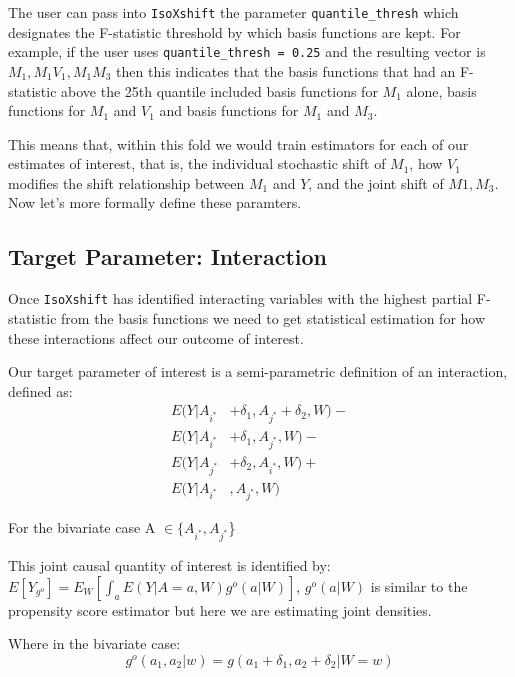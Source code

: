 \documentclass[
]{article}
\begin{document}
The user can pass into \texttt{IsoXshift} the parameter
\texttt{quantile\_thresh} which designates the F-statistic threshold by
which basis functions are kept. For example, if the user uses
\texttt{quantile\_thresh\ =\ 0.25} and the resulting vector is
\(M_1, M_1V_1, M_1M_3\) then this indicates that the basis functions
that had an F-statistic above the 25th quantile included basis functions
for \(M_1\) alone, basis functions for \(M_1\) and \(V_1\) and basis
functions for \(M_1\) and \(M_3\).

This means that, within this fold we would train estimators for each of
our estimates of interest, that is, the individual stochastic shift of
\(M_1\), how \(V_1\) modifies the shift relationship between \(M_1\) and
\(Y\), and the joint shift of \(M1,M_3\). Now let's more formally define
these paramters.

\hypertarget{target-parameter-interaction}{%
\subsection{Target Parameter:
Interaction}\label{target-parameter-interaction}}

Once \texttt{IsoXshift} has identified interacting variables with the
highest partial F-statistic from the basis functions we need to get
statistical estimation for how these interactions affect our outcome of
interest.

Our target parameter of interest is a semi-parametric definition of an
interaction, defined as: \begin{equation} \label{eq1}
\begin{split}
E(Y|A_{i^*} &+ \delta_1, A_{j^*} + \delta_2, W) - \\ 
E(Y|A_{i^*} &+ \delta_1, A_{j^*}, W) - \\ 
E(Y|A_{j^*} &+ \delta_2,  A_{i^*}, W) + \\
E(Y|A_{i^*}&, A_{j^*}, W) 
\end{split}
\end{equation}

For the bivariate case A \(\in \{A_{i^*}, A_{j^*}\)\}

This joint causal quantity of interest is identified by:
\(E[Y_{g^o}] = E_W [\int_a E(Y|A=a, W)g^o(a|W)]\), \(g^o(a|W)\) is
similar to the propensity score estimator but here we are estimating
joint densities.

Where in the bivariate case:
\[g^o(a_1, a_2|w) = g(a_1 + \delta_1, a_2 + \delta_2|W = w)\]
\end{document}
